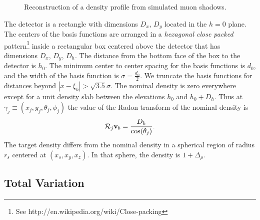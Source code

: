 \documentclass[twocolumn]{article}
\newcommand{\Radon}{{\cal R}}
\newcommand{\av}{\mathbf{v}}%
\begin{document}
\begin{figure*}
  \centering 
  \resizebox{0.32\textwidth}{!}{ } 
  \resizebox{0.32\textwidth}{!}{ }
  \resizebox{0.32\textwidth}{!}{ }  
  \caption{Reconstruction of a density profile from simulated muon shadows.}
  \label{fig:sim1}
\end{figure*}

The detector is a rectangle with dimensions $D_x$, $D_y$ located in
the $h=0$ plane.  The centers of the basis functions are arranged in a
\emph{hexagonal close packed} pattern\footnote{See
  http://en.wikipedia.org/wiki/Close-packing} inside a rectangular box
centered above the detector that has dimensions $D_x$, $D_y$, $D_h$.
The distance from the bottom face of the box to the detector is $h_0$.
The minimum center to center spacing for the basis functions is $d_0$,
and the width of the basis function is $\sigma = \frac{d_0}{2}$.  We
truncate the basis functions for distances beyond
$\left|x-\xi_k\right| > \sqrt{3.5}\sigma$.  The nominal density is
zero everywhere except for a unit density slab between the elevations
$h_0$ and $h_0+D_h$.  Thus at $\gamma_j \equiv
(x_j,y_j,\theta_j,\phi_j)$ the value of the Radon transform of the
nominal density is
\begin{equation*}
  \Radon_j \av_b = \frac{D_h}{\cos(\theta_j)}.
\end{equation*}
The target density differs from the nominal density in a spherical
region of radius $r_s$ centered at $(x_s,x_y,x_z)$.  In that sphere,
the density is $1+\Delta_\rho$.

\subsection{Total Variation}
\label{sec:Variation}
\end{document}
